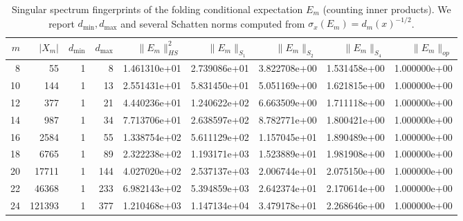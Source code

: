 \begin{table}[H]
\centering
\scriptsize
\setlength{\tabcolsep}{6pt}
\caption{Singular spectrum fingerprints of the folding conditional expectation $E_m$ (counting inner products). We report $d_{\min},d_{\max}$ and several Schatten norms computed from $\sigma_x(E_m)=d_m(x)^{-1/2}$.}
\label{tab:fold_conditional_expectation_singular_spectrum}
\begin{tabular}{r r r r r r r r r}
\toprule
$m$ & $|X_m|$ & $d_{\min}$ & $d_{\max}$ & $\|E_m\|_{HS}^2$ & $\|E_m\|_{S_1}$ & $\|E_m\|_{S_2}$ & $\|E_m\|_{S_4}$ & $\|E_m\|_{op}$\\
\midrule
8 & 55 & 1 & 8 & 1.461310e+01 & 2.739086e+01 & 3.822708e+00 & 1.531458e+00 & 1.000000e+00\\
10 & 144 & 1 & 13 & 2.551431e+01 & 5.831450e+01 & 5.051169e+00 & 1.621815e+00 & 1.000000e+00\\
12 & 377 & 1 & 21 & 4.440236e+01 & 1.240622e+02 & 6.663509e+00 & 1.711118e+00 & 1.000000e+00\\
14 & 987 & 1 & 34 & 7.713706e+01 & 2.638597e+02 & 8.782771e+00 & 1.800421e+00 & 1.000000e+00\\
16 & 2584 & 1 & 55 & 1.338754e+02 & 5.611129e+02 & 1.157045e+01 & 1.890489e+00 & 1.000000e+00\\
18 & 6765 & 1 & 89 & 2.322238e+02 & 1.193171e+03 & 1.523889e+01 & 1.981908e+00 & 1.000000e+00\\
20 & 17711 & 1 & 144 & 4.027020e+02 & 2.537137e+03 & 2.006744e+01 & 2.075150e+00 & 1.000000e+00\\
22 & 46368 & 1 & 233 & 6.982143e+02 & 5.394859e+03 & 2.642374e+01 & 2.170614e+00 & 1.000000e+00\\
24 & 121393 & 1 & 377 & 1.210468e+03 & 1.147134e+04 & 3.479178e+01 & 2.268646e+00 & 1.000000e+00\\
\bottomrule
\end{tabular}
\end{table}
